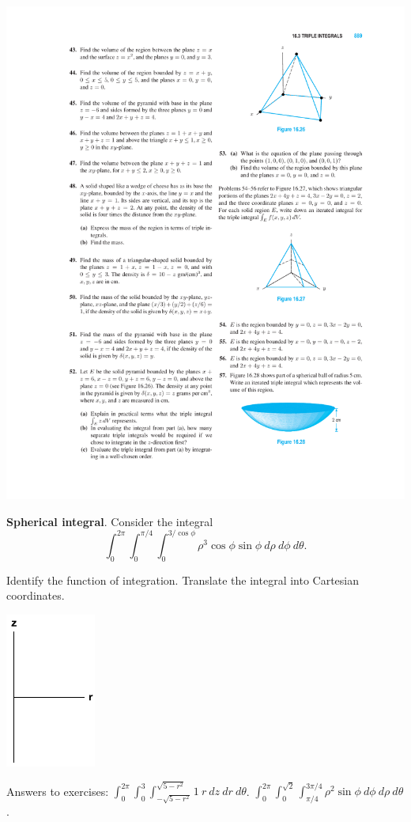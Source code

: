 \documentclass[12pt,letterpaper,noanswers]{exam}
\begin{document}
\includegraphics{img/W05p2.pdf}




\noindent\textbf{Spherical integral}.  Consider the integral \[\int_0^{2\pi}\int_0^{\pi/4}\int_0^{3/\cos\phi}\rho^3\cos\phi\sin\phi\ d\rho\ d\phi\ d\theta.\]  

Identify the function of integration. Translate the integral into Cartesian coordinates.


\includegraphics[height=2in]{img/C13rzaxes.png}

Answers to exercises: $\int_0^{2\pi}\int_0^3\int_{-\sqrt{5-r^2}}^{\sqrt{5-r^2}}1\ r\ dz\ dr\ d\theta$.  $\int_0^{2\pi}\int_0^{\sqrt{2}}\int_{\pi/4}^{3\pi/4} \rho^2\sin\phi\ d\phi\ d\rho\ d\theta$.
\end{document}
